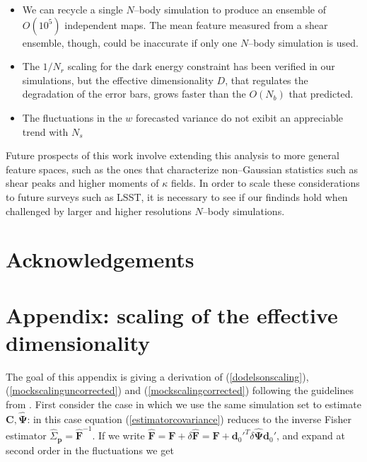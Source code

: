 \documentclass[reprint,aps,prd,superscriptaddress,showkeys,showpacs]{revtex4-1}
\newcommand{\bb}[1]{\mathbf{#1}}
\newcommand{\bbh}[1]{\mathbf{\hat{#1}}}
\newcommand{\h}[1]{\hat{#1}}
\begin{document}
\begin{itemize}
\item We can recycle a single $N$--body simulation to produce an ensemble of $O(10^5)$ independent maps. The mean feature measured from a shear ensemble, though, could be inaccurate if only one $N$--body simulation is used.  
\item The $1/N_r$ scaling for the dark energy constraint has been verified in our simulations, but the effective dimensionality $D$, that regulates the degradation of the error bars, grows faster than the $O(N_b)$ that \citep{DodelsonSchneider13} predicted. 
\item The fluctuations in the $w$ forecasted variance do not exibit an appreciable trend with $N_s$ 
\end{itemize}
%
Future prospects of this work involve extending this analysis to more general feature spaces, such as the ones that characterize non--Gaussian statistics such as shear peaks and higher moments of $\kappa$ fields. In order to scale these considerations to future surveys such as LSST, it is necessary to see if our findinds hold when challenged by larger and higher resolutions $N$--body simulations.  

 

\section*{Acknowledgements}




\section*{Appendix: scaling of the effective dimensionality}
\label{appendix}

The goal of this appendix is giving a derivation of (\ref{dodelsonscaling}),(\ref{mockscalinguncorrected}) and (\ref{mockscalingcorrected}) following the guidelines from \citep{DodelsonSchneider13,Taylor12}. First consider the case in which we use the same simulation set to estimate $\bb{C},\bbh{\Psi}$: in this case equation (\ref{estimatorcovariance}) reduces to the inverse Fisher estimator $\h{\Sigma}_\bb{p}=\bbh{F}^{-1}$. If we write $\bbh{F}=\bb{F}+\delta\bbh{F}=\bb{F}+\bb{d}_0'^T\delta\bbh{\Psi}\bb{d}_0'$, and expand at second order in the fluctuations we get
\end{document}

